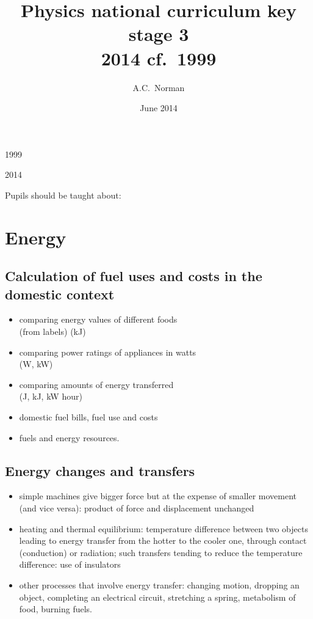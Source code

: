 \documentclass[10pt]{article}
\begin{document}
\setcounter{secnumdepth}{0}

\title{Physics national curriculum key stage 3\\2014 cf.\ 1999}
\author{A.C.\ Norman}
\date{June 2014}
\maketitle

\thispagestyle{empty}

\setlength{\parindent}{0pt}

\begin{paracol}{2}

\begin{center}
\Large 1999
\end{center}

\switchcolumn

\begin{center}
\Large 2014
\end{center}

\switchcolumn

\switchcolumn

Pupils should be taught about:
\section{Energy}
\subsection{Calculation of fuel uses and costs in the domestic context}
\begin{itemize}
\item comparing energy values of different foods\\ (from labels) (kJ)
\item comparing power ratings of appliances in watts\\ (W, kW)
\item comparing amounts of energy transferred\\ (J, kJ, kW hour)
\item domestic fuel bills, fuel use and costs
\item fuels and energy resources.
\end{itemize}
\subsection{Energy changes and transfers}
\begin{itemize}
\item  simple machines give bigger force but at the expense of smaller movement (and vice
versa): product of force and displacement unchanged
\item heating and thermal equilibrium: temperature difference between two objects leading to
energy transfer from the hotter to the cooler one, through contact (conduction) or
radiation; such transfers tending to reduce the temperature difference: use of insulators
\item other processes that involve energy transfer: changing motion, dropping an object,
completing an electrical circuit, stretching a spring, metabolism of food, burning fuels.

\end{itemize}
\end{paracol}
\end{document}
